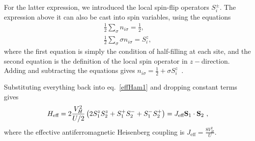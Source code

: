 \documentclass[reprint,hidelinks,onecolumn]{revtex4-2}
\begin{document}
For the latter expression, we introduced the local spin-flip operators \(S_i^\pm\). The expression above it can also be cast into spin variables, using the equations
\begin{equation}\begin{aligned}
	\frac{1}{2}\sum_{\sigma}n_{i\sigma} = \frac{1}{2},\\
    \frac{1}{2}\sum_{\sigma}\sigma n_{i\sigma} = S_i^z,
\end{aligned}\end{equation}
where the first equation is simply the condition of half-filling at each site, and the second equation is the definition of the local spin operator in \(z-\)direction. Adding and subtracting the equations gives \(n_{i\sigma} = \frac{1}{2} + \sigma S_i^z\)~.

Substituting everything back into eq.~\ref{effHam1} and dropping constant terms gives
\begin{equation}\begin{aligned}
	H_\text{eff} = 2\frac{V_H^2}{U/2}\left(2S_1^z S_2^z + S_1^+S_2^- + S_1^-S_2^+\right) = J_\text{eff} {\bf S}_1\cdot{\bf S}_2~,
\end{aligned}\end{equation}
where the effective antiferromagnetic Heisenberg coupling is \(J_\text{eff} = \frac{8V_H^2}{U}\).
\end{document}

